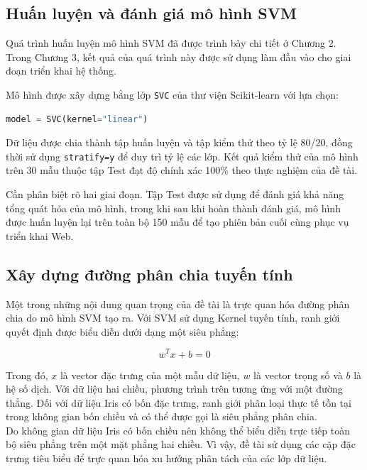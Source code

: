\documentclass[14pt]{extarticle}
\begin{document}
	
	\subsection{Huấn luyện và đánh giá mô hình SVM}
	
	\noindent Quá trình huấn luyện mô hình SVM đã được trình bày chi tiết ở Chương 2. Trong Chương 3, kết quả của quá trình này được sử dụng làm đầu vào cho giai đoạn triển khai hệ thống.
	
	\noindent Mô hình được xây dựng bằng lớp \texttt{SVC} của thư viện Scikit-learn với lựa chọn:
	
	\begin{lstlisting}[language=Python, numbers=none]
		model = SVC(kernel="linear")
	\end{lstlisting}
	
	\noindent Dữ liệu được chia thành tập huấn luyện và tập kiểm thử theo tỷ lệ 80/20, đồng thời sử dụng \texttt{stratify=y} để duy trì tỷ lệ các lớp. Kết quả kiểm thử của mô hình trên 30 mẫu thuộc tập Test đạt độ chính xác 100\% theo thực nghiệm của đề tài.
	
	\noindent Cần phân biệt rõ hai giai đoạn. Tập Test được sử dụng để đánh giá khả năng tổng quát hóa của mô hình, trong khi sau khi hoàn thành đánh giá, mô hình được huấn luyện lại trên toàn bộ 150 mẫu để tạo phiên bản cuối cùng phục vụ triển khai Web.
	
	\subsection{Xây dựng đường phân chia tuyến tính}
	
	\noindent Một trong những nội dung quan trọng của đề tài là trực quan hóa đường phân chia do mô hình SVM tạo ra. Với SVM sử dụng Kernel tuyến tính, ranh giới quyết định được biểu diễn dưới dạng một siêu phẳng:
	
	$$
	w^T x+b=0
	$$
	
	\noindent Trong đó, $x$ là vector đặc trưng của một mẫu dữ liệu, $w$ là vector trọng số và $b$ là hệ số dịch. Với dữ liệu hai chiều, phương trình trên tương ứng với một đường thẳng. Đối với dữ liệu Iris có bốn đặc trưng, ranh giới phân loại thực tế tồn tại trong không gian bốn chiều và có thể được gọi là siêu phẳng phân chia.\\
	
	\noindent Do không gian dữ liệu Iris có bốn chiều nên không thể biểu diễn trực tiếp toàn bộ siêu phẳng trên một mặt phẳng hai chiều. Vì vậy, đề tài sử dụng các cặp đặc trưng tiêu biểu để trực quan hóa xu hướng phân tách của các lớp dữ liệu.\\
	
\end{document}

